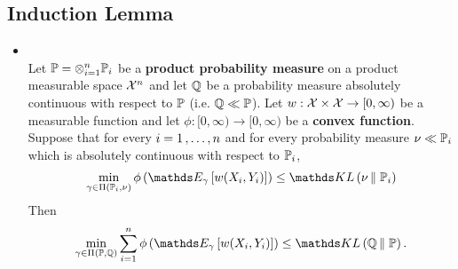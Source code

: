\documentclass[11pt]{article}
\begin{document}
\subsection{Induction Lemma}
\begin{itemize}
\item \begin{lemma} \citep{boucheron2013concentration}\\
Let ${\mathbb P} = \otimes_{i=1}^{n}{\mathbb P}_i$ be a \textbf{product probability measure} on a product measurable space ${\mathcal X}^n$ and let ${\mathbb Q}$ be a probability measure absolutely continuous with respect to ${\mathbb P}$ (i.e. ${\mathbb Q} \ll {\mathbb P}$). Let $w : {\mathcal X} \times {\mathcal X} \to [0, \infty)$ be a measurable function and let $\phi : [0, \infty) \to [0, \infty)$ be a \textbf{convex function}. Suppose that for every $i = 1 \,{,}\ldots{,}\, n$ and for every probability measure $\nu \ll {\mathbb P}_i$ which is absolutely continuous with respect to ${\mathbb P}_i$,
\begin{align*}
\min_{\gamma \in \Pi( \bP_i, \nu)}\phi\paren{\E{\gamma}{w(X_i, Y_i)}} \le \kl{\nu}{\bP_i}
\end{align*} Then
\begin{align*}
\min_{\gamma \in \Pi( \bP, \bQ)} \sum_{i=1}^{n}\phi\paren{\E{\gamma}{w(X_i, Y_i)}} \le \kl{\bQ}{\bP}.
\end{align*}
\end{lemma}
\end{itemize}

\end{document}
